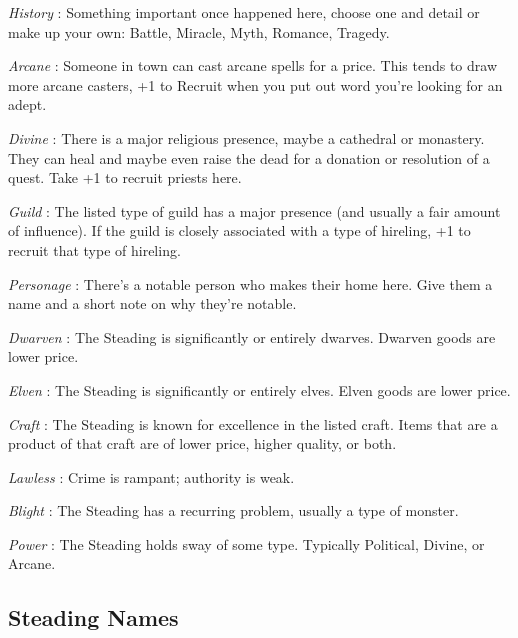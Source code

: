  

{\em History} : Something important once happened here, choose one and detail or make up your own: Battle, Miracle, Myth, Romance, Tragedy.

 

{\em Arcane} : Someone in town can cast arcane spells for a price. This tends to draw more arcane casters, +1 to Recruit when you put out word you're looking for an adept.

 

{\em Divine} : There is a major religious presence, maybe a cathedral or monastery. They can heal and maybe even raise the dead for a donation or resolution of a quest. Take +1 to recruit priests here.

 

{\em Guild} : The listed type of guild has a major presence (and usually a fair amount of influence). If the guild is closely associated with a type of hireling, +1 to recruit that type of hireling.

 

{\em Personage} : There's a notable person who makes their home here. Give them a name and a short note on why they're notable.

 

{\em Dwarven} : The Steading is significantly or entirely dwarves. Dwarven goods are lower price.

 

{\em Elven} : The Steading is significantly or entirely elves. Elven goods are lower price.

 

{\em Craft} : The Steading is known for excellence in the listed craft. Items that are a product of that craft are of lower price, higher quality, or both.

 

{\em Lawless} : Crime is rampant; authority is weak.

 

{\em Blight} : The Steading has a recurring problem, usually a type of monster.

 

{\em Power} : The Steading holds sway of some type. Typically Political, Divine, or Arcane.

 
\subsection{Steading Names}   
 

